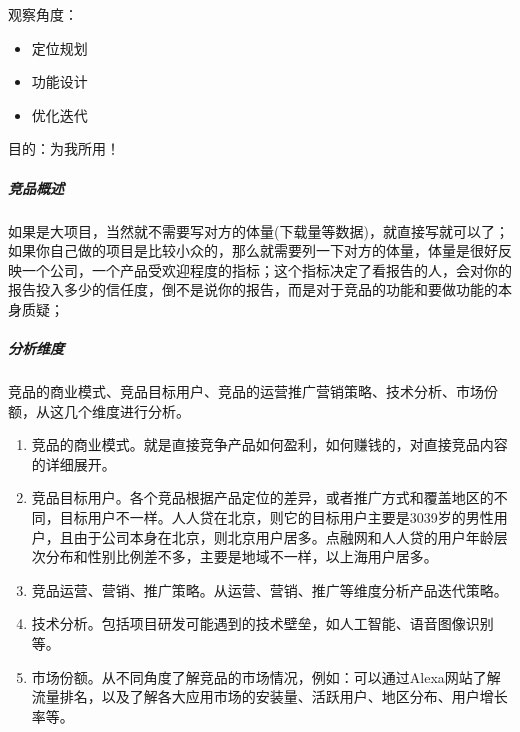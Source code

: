\documentclass[letterpaper,11pt,english]{sphinxmanual}
\begin{document}
观察角度：
\begin{itemize}
\item {} 
定位规划

\item {} 
功能设计

\item {} 
优化迭代

\end{itemize}

目的：为我所用！


\subparagraph{竞品概述}
\label{\detokenize{chapter_knowledge/goods_analysis:id17}}
如果是大项目，当然就不需要写对方的体量(下载量等数据)，就直接写就可以了；如果你自己做的项目是比较小众的，那么就需要列一下对方的体量，体量是很好反映一个公司，一个产品受欢迎程度的指标；这个指标决定了看报告的人，会对你的报告投入多少的信任度，倒不是说你的报告，而是对于竞品的功能和要做功能的本身质疑；%
\begin{footnote}[456]\sphinxAtStartFootnote
{}
%
\end{footnote}


\subparagraph{分析维度}
\label{\detokenize{chapter_knowledge/goods_analysis:id18}}
竞品的商业模式、竞品目标用户、竞品的运营推广营销策略、技术分析、市场份额，从这几个维度进行分析。%
\begin{footnote}[457]\sphinxAtStartFootnote
{}
%
\end{footnote}
\begin{enumerate}
%
\item {} 
竞品的商业模式。就是直接竞争产品如何盈利，如何赚钱的，对直接竞品内容的详细展开。

\item {} 
竞品目标用户。各个竞品根据产品定位的差异，或者推广方式和覆盖地区的不同，目标用户不一样。人人贷在北京，则它的目标用户主要是30\sphinxhyphen{}39岁的男性用户，且由于公司本身在北京，则北京用户居多。点融网和人人贷的用户年龄层次分布和性别比例差不多，主要是地域不一样，以上海用户居多。

\item {} 
竞品运营、营销、推广策略。从运营、营销、推广等维度分析产品迭代策略。

\item {} 
技术分析。包括项目研发可能遇到的技术壁垒，如人工智能、语音图像识别等。

\item {} 
市场份额。从不同角度了解竞品的市场情况，例如：可以通过Alexa网站了解流量排名，以及了解各大应用市场的安装量、活跃用户、地区分布、用户增长率等。

\end{enumerate}
\end{document}

